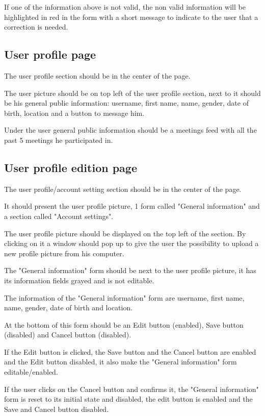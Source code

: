 \documentclass[conference]{IEEEtran}
\begin{document}
If one of the information above is not valid, the non valid information will be highlighted in red in the form with a short message to indicate to the user that a correction is needed.

\subsection{User profile page}

The user profile section should be in the center of the page.

The user picture should be on top left of the user profile section, next to it should be his general public information: username, first name, name, gender, date of birth, location and a button to message him.

Under the user general public information should be a meetings feed with all the past 5 meetings he participated in.

\subsection{User profile edition page}

The user profile/account setting section should be in the center of the page.

It should present the user profile picture, 1 form called "General information" and a section called "Account settings".

The user profile picture should be displayed on the top left of the section. By clicking on it a window should pop up to give the user the possibility to upload a new profile picture from his computer.

The "General information" form should be next to the user profile picture, it has its information fields grayed and is not editable.

The information of the "General information" form are username, first name, name, gender, date of birth and location.

At the bottom of this form should be an Edit button (enabled), Save button (disabled) and Cancel button (disabled). 

If the Edit button is clicked, the Save button and the Cancel button are enabled and the Edit button disabled, it also make the "General information" form editable/enabled.

If the user clicks on the Cancel button and confirms it, the "General information" form is reset to its initial state and disabled, the edit button is enabled and the Save and Cancel button disabled.
\end{document}
